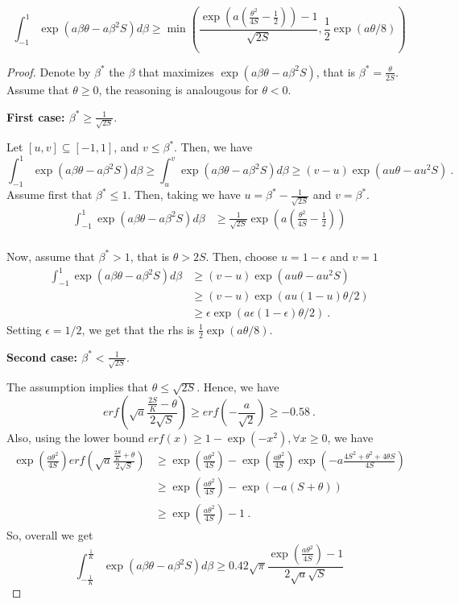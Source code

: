 \documentclass{colt2016_empty} %
\begin{document}
\begin{theorem}
\[
\int_{-1}^{1} \exp(a \beta \theta - a \beta^2 S) d\beta 
\geq \min\left(\frac{\exp(a(\frac{\theta^2}{4 S}-\frac{1}{2})) -1}{\sqrt{2S}},\frac{1}{2} \exp(a \theta/8)\right)
\]
\end{theorem}
%
\begin{proof}
Denote  by $\beta^*$ the $\beta$ that maximizes $\exp(a \beta \theta - a \beta^2 S)$, that is $\beta^*=\tfrac{\theta}{2 S}$.
Assume that $\theta\geq0$, the reasoning is analougous for $\theta<0$.

\textbf{First case: $\beta^*\geq \tfrac{1}{\sqrt{2 S}}$}.

Let $[u,v] \subseteq [-1,1]$, and $v \leq \beta^*$.
Then, we have
\[
\int_{-1}^{1} \exp(a \beta \theta - a \beta^2 S) d\beta 
\geq \int_{u}^{v} \exp(a \beta \theta - a \beta^2 S) d\beta
\geq (v-u) \exp(a u \theta - a u^2 S)~.
\]
Assume first that $\beta^*\leq 1$. Then, taking  we have $u=\beta^*-\tfrac{1}{\sqrt{2S}}$ and $v=\beta^*$.
\begin{align}
\int_{-1}^{1} \exp(a \beta \theta - a \beta^2 S) d\beta 
&\geq \frac{1}{\sqrt{2S}} \exp(a (\tfrac{\theta^2}{4 S}-\tfrac{1}{2})) \\
\end{align}

Now, assume that $\beta^*>1$, that is $\theta>2 S$. Then, choose $u=1-\epsilon$ and $v=1$
\begin{align}
\int_{-1}^{1} \exp(a \beta \theta - a \beta^2 S) d\beta 
&\geq (v-u) \exp(a u \theta - a u^2 S) \\
&\geq (v-u) \exp(a u(1 - u )\theta/2) \\
&\geq \epsilon \exp(a \epsilon(1 - \epsilon )\theta/2)~.
\end{align}
Setting $\epsilon=1/2$, we get that the rhs is $\frac{1}{2} \exp(a \theta/8)$.

\textbf{Second case: $\beta^*< \tfrac{1}{\sqrt{2 S}}$}.

The assumption implies that $\theta \leq \sqrt{2 S}$.
Hence, we have
\[
erf(\sqrt{a}\frac{\frac{2 S}{K}-\theta}{2 \sqrt{S}}) \geq erf(-\frac{a}{\sqrt{2}}) \geq -0.58~.
\]
Also, using the lower bound $erf(x)\geq 1-\exp(-x^2), \forall x\geq0$, we have
\begin{align}
\exp(\frac{a \theta^2}{4 S}) erf(\sqrt{a}\frac{\frac{2 S}{K}+\theta}{2 \sqrt{S}}) 
&\geq \exp(\frac{a \theta^2}{4 S})-\exp(\frac{a \theta^2}{4 S})\exp(-a \frac{4S^2+\theta^2+4 \theta S }{4 S}) \\
&\geq \exp(\frac{a \theta^2}{4 S})-\exp(-a (S+ \theta )) \\
&\geq \exp(\frac{a \theta^2}{4 S})-1~.
\end{align}
So, overall we get
\[
\int_{-\tfrac{1}{K}}^{\tfrac{1}{K}} \exp(a \beta \theta - a \beta^2 S) d\beta 
\geq  0.42 \sqrt{\pi} \frac{\exp(\frac{a \theta^2}{4 S}) -1}{2 \sqrt{a} \sqrt{S}}
\]
\end{proof}
\end{document}
